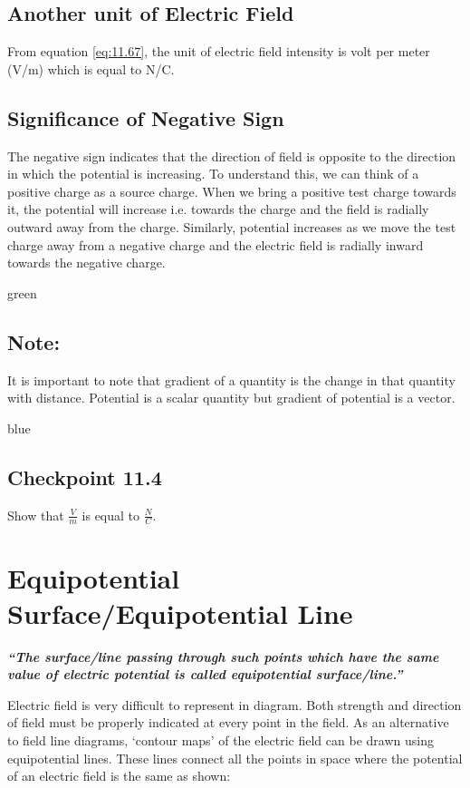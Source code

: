 \subsection*{Another unit of Electric Field}
From equation \ref{eq:11.67}, the unit of electric field intensity is
volt per meter (V/m) which is equal to N/C.
\subsection*{Significance of Negative Sign}
The negative sign indicates that the direction of field is opposite
to the direction in which the potential is increasing. To understand this, we can think of a positive charge as a source charge.
When we bring a positive test charge towards it,
the potential will increase i.e. towards the charge and the field is
radially outward away from the charge. Similarly, potential increases as we
move the test charge away from a negative charge and the electric
field is radially inward towards the negative charge.
\begin{mybox}{green}{}
\subsection*{\note{}Note:}
It is important to note that gradient of a quantity is the change in that
quantity with distance. Potential is a scalar quantity but gradient of
potential is a vector.
\end{mybox}
\begin{mybox}{blue}{}
\subsection*{\checkpoint{} Checkpoint 11.4}
Show that $\frac{V}{m}$ is equal to $\frac{N}{C}$.
\end{mybox}
\section{Equipotential Surface/Equipotential Line}
\textit{\textbf{“The surface/line passing through such points which have
the same value of electric potential is called equipotential surface/line.”}}

Electric field is very difficult to represent in diagram.
Both strength and direction of field must be properly indicated at
every point in the field. As an alternative to field line diagrams,
`contour maps’ of the electric field can be drawn using equipotential lines.
These lines connect all the points in space where the potential of an
electric field is the same as shown:
